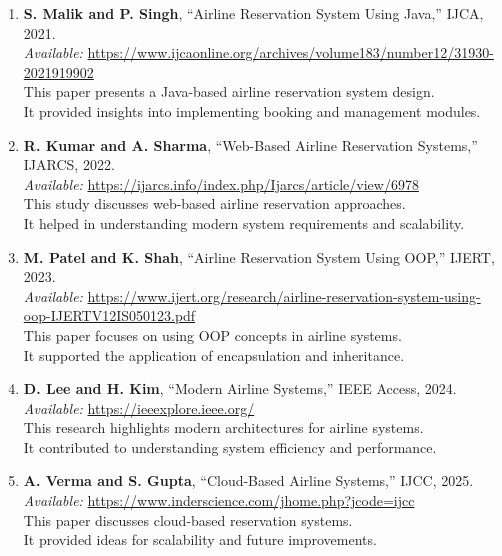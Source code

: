 \documentclass[a4paper,timesnewroman,12pt,twoside]{report}
\numberwithin{equation}{section}
\begin{document}
\begin{enumerate}
\item \textbf{S. Malik and P. Singh}, “Airline Reservation System Using Java,” IJCA, 2021.\\
\textit{Available:} \url{https://www.ijcaonline.org/archives/volume183/number12/31930-2021919902}\\
\hspace*{1em}This paper presents a Java-based airline reservation system design.\\
\hspace*{1em}It provided insights into implementing booking and management modules.

\item \textbf{R. Kumar and A. Sharma}, “Web-Based Airline Reservation Systems,” IJARCS, 2022.\\
\textit{Available:} \url{https://ijarcs.info/index.php/Ijarcs/article/view/6978}\\
\hspace*{1em}This study discusses web-based airline reservation approaches.\\
\hspace*{1em}It helped in understanding modern system requirements and scalability.

\item \textbf{M. Patel and K. Shah}, “Airline Reservation System Using OOP,” IJERT, 2023.\\
\textit{Available:} \url{https://www.ijert.org/research/airline-reservation-system-using-oop-IJERTV12IS050123.pdf}\\
\hspace*{1em}This paper focuses on using OOP concepts in airline systems.\\
\hspace*{1em}It supported the application of encapsulation and inheritance.

\item \textbf{D. Lee and H. Kim}, “Modern Airline Systems,” IEEE Access, 2024.\\
\textit{Available:} \url{https://ieeexplore.ieee.org/}\\
\hspace*{1em}This research highlights modern architectures for airline systems.\\
\hspace*{1em}It contributed to understanding system efficiency and performance.

\item \textbf{A. Verma and S. Gupta}, “Cloud-Based Airline Systems,” IJCC, 2025.\\
\textit{Available:} \url{https://www.inderscience.com/jhome.php?jcode=ijcc}\\
\hspace*{1em}This paper discusses cloud-based reservation systems.\\
\hspace*{1em}It provided ideas for scalability and future improvements.


\end{enumerate}
\end{document}
